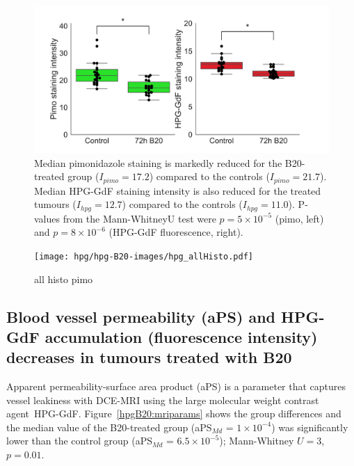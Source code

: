 \begin{figure}[htbp] %
  \centering
  \includegraphics[width=\textwidth]{hpg/hpg-B20-images/hpg_pimoHPG-GdF.pdf}
  \caption{Median pimonidazole staining is markedly reduced for the B20-treated group ($I_{pimo} = 17.2$) compared to the controls ($I_{pimo} = 21.7$).
  Median \acs{HPG-GdF} staining intensity is also reduced for the treated tumours ($I_{hpg} = 12.7$) compared to the controls ($I_{hpg} =11.0$).
  P-values from the Mann-WhitneyU test were $p = 5\times10^{-5}$ (pimo, left) and $p = 8\times10^{-6}$ (\acs{HPG-GdF} fluorescence, right).}
  \label{hpgB20:accumulation}
\end{figure}

\begin{figure}[htbp] %
  \centering
  \texttt{[image: hpg/hpg-B20-images/hpg\_allHisto.pdf]} 
  \captionsetup{width=\linewidth}
  \caption{all histo pimo}
  \label{hpg:allHisto}
\end{figure}

\subsection{Blood vessel permeability (\acs{aPS}) and HPG-GdF accumulation (fluorescence intensity) decreases in tumours treated with B20}

Apparent permeability-surface area product (\acs{aPS}) is a parameter that captures vessel leakiness with \acs{DCE-MRI} using the large molecular weight contrast agent~\acs{HPG-GdF}.
Figure~\ref{hpgB20:mriparams} shows the group differences and the median value of the B20-treated group (aPS$_{Md}$ = $1\times10^{-4}$) was significantly lower than the control group (aPS$_{Md}$ = $6.5\times10^{-5}$); Mann-Whitney $U = 3$, $p = 0.01$.

